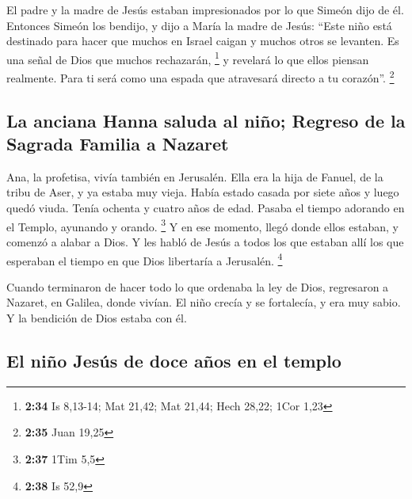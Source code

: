  El padre y la madre de Jesús estaban impresionados por
lo que Simeón dijo de él.  Entonces Simeón los bendijo, y
dijo a María la madre de Jesús: ``Este niño está destinado para hacer
que muchos en Israel caigan y muchos otros se levanten. Es una señal de
Dios que muchos rechazarán, \footnote{\textbf{2:34} Is 8,13-14; Mat
  21,42; Mat 21,44; Hech 28,22; 1Cor 1,23}  y revelará lo
que ellos piensan realmente. Para ti será como una espada que atravesará
directo a tu corazón''. \footnote{\textbf{2:35} Juan 19,25}

\hypertarget{la-anciana-hanna-saluda-al-niuxf1o-regreso-de-la-sagrada-familia-a-nazaret}{%
\subsection{La anciana Hanna saluda al niño; Regreso de la Sagrada
Familia a
Nazaret}\label{la-anciana-hanna-saluda-al-niuxf1o-regreso-de-la-sagrada-familia-a-nazaret}}

 Ana, la profetisa, vivía también en Jerusalén. Ella era
la hija de Fanuel, de la tribu de Aser, y ya estaba muy vieja. Había
estado casada por siete años  y luego quedó viuda. Tenía
ochenta y cuatro años de edad. Pasaba el tiempo adorando en el Templo,
ayunando y orando. \footnote{\textbf{2:37} 1Tim 5,5}  Y
en ese momento, llegó donde ellos estaban, y comenzó a alabar a Dios. Y
les habló de Jesús a todos los que estaban allí los que esperaban el
tiempo en que Dios libertaría a Jerusalén. \footnote{\textbf{2:38} Is
  52,9}

 Cuando terminaron de hacer todo lo que ordenaba la ley
de Dios, regresaron a Nazaret, en Galilea, donde vivían. 
El niño crecía y se fortalecía, y era muy sabio. Y la bendición de Dios
estaba con él.

\hypertarget{el-niuxf1o-jesuxfas-de-doce-auxf1os-en-el-templo}{%
\subsection{El niño Jesús de doce años en el
templo}\label{el-niuxf1o-jesuxfas-de-doce-auxf1os-en-el-templo}}

